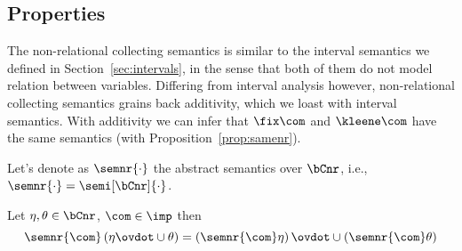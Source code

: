 \subsection{Properties}\label{sub:nonrelprop}

The non-relational collecting semantics is similar to the interval
semantics we defined in Section~\ref{sec:intervals}, in the sense that
both of them do not model relation between variables. Differing from
interval analysis however, non-relational collecting semantics grains
back additivity, which we loast with interval semantics. With
additivity we can infer that \(\fix\com\) and \(\kleene\com\) have the
same semantics (with Proposition~\ref{prop:samenr}).

\medskip

\noindent
Let's denote as \(\semnr{\cdot}\) the abstract semantics over
\(\bCnr\), i.e., \(\semnr{\cdot} = \semi[\bCnr]{\cdot}\).

\begin{lemma}[Additivity]
  Let \(\eta, \theta \in \bCnr\), \(\com\in\imp\) then
  \begin{equation*}
    \semnr{\com}\left(\eta \ovdot\cup \theta\right) = \left(\semnr{\com}\eta\right) \ovdot\cup \left(\semnr{\com}\theta\right)
  \end{equation*}
\end{lemma}

